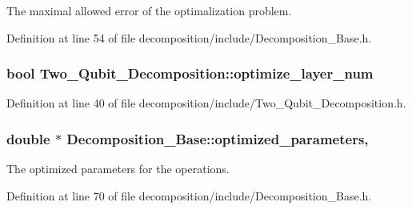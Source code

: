 The maximal allowed error of the optimalization problem. 



Definition at line 54 of file decomposition/include/\+Decomposition\+\_\+\+Base.\+h.

\subsubsection[{\texorpdfstring{optimize\+\_\+layer\+\_\+num}{optimize_layer_num}}]{\setlength{\rightskip}{0pt plus 5cm}bool Two\+\_\+\+Qubit\+\_\+\+Decomposition\+::optimize\+\_\+layer\+\_\+num\hspace{0.3cm}{\ttfamily [protected]}}\hypertarget{class_two___qubit___decomposition_adef11f7613b1d3025451137233c92e92}{}\label{class_two___qubit___decomposition_adef11f7613b1d3025451137233c92e92}


Definition at line 40 of file decomposition/include/\+Two\+\_\+\+Qubit\+\_\+\+Decomposition.\+h.

\subsubsection[{\texorpdfstring{optimized\+\_\+parameters}{optimized_parameters}}]{\setlength{\rightskip}{0pt plus 5cm}double $\ast$ Decomposition\+\_\+\+Base\+::optimized\+\_\+parameters\hspace{0.3cm}{\ttfamily [protected]}, {\ttfamily [inherited]}}\hypertarget{class_decomposition___base_a38bb2fae99a99736eaafbf9741eb2f5d}{}\label{class_decomposition___base_a38bb2fae99a99736eaafbf9741eb2f5d}


The optimized parameters for the operations. 



Definition at line 70 of file decomposition/include/\+Decomposition\+\_\+\+Base.\+h.

